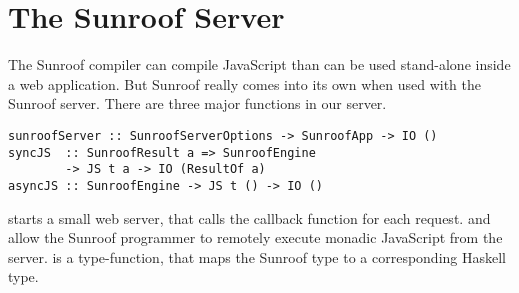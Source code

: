  
\section{The Sunroof Server}
\label{sec:server}

The Sunroof compiler can compile JavaScript than can be used
stand-alone inside a web application. But Sunroof really comes
into its own when used with the Sunroof server. There
are three major functions in our server.

\begin{verbatim}
sunroofServer :: SunroofServerOptions -> SunroofApp -> IO ()
syncJS  :: SunroofResult a => SunroofEngine 
        -> JS t a -> IO (ResultOf a)
asyncJS :: SunroofEngine -> JS t () -> IO ()
\end{verbatim}        

 starts a small web server,
that calls the callback function for each request.
 and  allow the Sunroof programmer
to remotely execute monadic JavaScript from the server.
 is a type-function, that maps the 
Sunroof type to a corresponding Haskell type.




